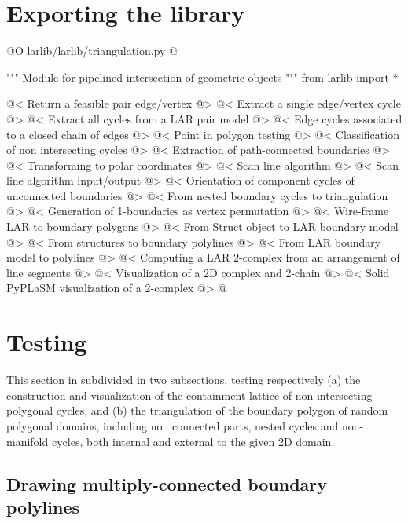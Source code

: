 \documentclass[11pt,oneside]{article}	%
\begin{document}
\section{Exporting the library}

@O larlib/larlib/triangulation.py
@{""" Module for pipelined intersection of geometric objects """
from larlib import *

@< Return a feasible pair edge/vertex @>
@< Extract a single edge/vertex cycle @>
@< Extract all cycles from a LAR pair model @>
@< Edge cycles associated to a closed chain of edges @>
@< Point in polygon testing @>
@< Classification of non intersecting cycles @>
@< Extraction of path-connected boundaries @>
@< Transforming to polar coordinates @>
@< Scan line algorithm @>
@< Scan line algorithm input/output @>
@< Orientation of component cycles of unconnected boundaries @>
@< From nested boundary cycles to triangulation @>
@< Generation of 1-boundaries as vertex permutation @>
@< Wire-frame LAR to boundary polygons @>
@< From Struct object to LAR boundary model @>
@< From structures to boundary polylines @>
@< From LAR boundary model to polylines @>
@< Computing a LAR 2-complex from an arrangement of line segments @>
@< Visualization of a 2D complex and 2-chain @>
@< Solid PyPLaSM visualization of a 2-complex @>
@}


\section{Testing }

This section in subdivided in two subsections, testing respectively (a) the construction and visualization of the containment lattice of non-intersecting polygonal cycles, and (b) the triangulation of the boundary polygon of random polygonal domains, including non connected parts, nested cycles and non-manifold cycles, both internal and external to the given 2D domain.

\subsection{Drawing multiply-connected boundary polylines}
\end{document}
